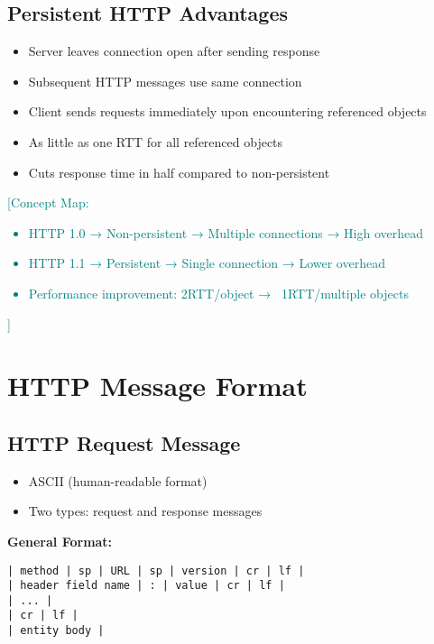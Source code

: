 \documentclass[12pt]{article}
\begin{document}
\subsection{Persistent HTTP Advantages}
\begin{itemize}
    \item Server leaves connection open after sending response
    \item Subsequent HTTP messages use same connection
    \item Client sends requests immediately upon encountering referenced objects
    \item As little as one RTT for all referenced objects
    \item Cuts response time in half compared to non-persistent
\end{itemize}

\textcolor{teal}{[Concept Map:
            \begin{itemize}
                \item HTTP 1.0 → Non-persistent → Multiple connections → High overhead
                \item HTTP 1.1 → Persistent → Single connection → Lower overhead
                \item Performance improvement: 2RTT/object → ~1RTT/multiple objects
            \end{itemize}
        ]}

\section{HTTP Message Format}

\subsection{HTTP Request Message}
\begin{itemize}
    \item ASCII (human-readable format)
    \item Two types: request and response messages
\end{itemize}

\textbf{General Format:}
\begin{verbatim}
| method | sp | URL | sp | version | cr | lf |
| header field name | : | value | cr | lf |
| ... |
| cr | lf |
| entity body |
\end{verbatim}
\end{document}
